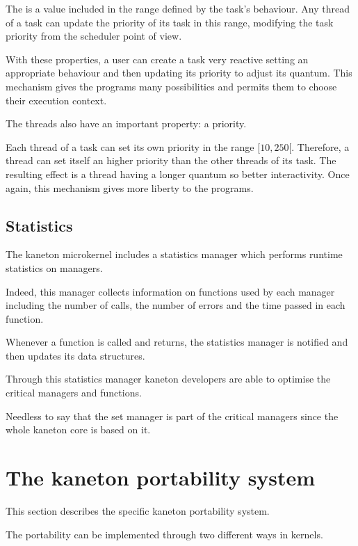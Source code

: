 \begin{multicols}{2}
The  is a value included in the range defined by the
task's behaviour. Any thread of a task can update the priority of its
task in this range, modifying the task priority from the scheduler
point of view.

With these properties, a user can create a task very reactive setting an
appropriate behaviour and then updating its priority to adjust its quantum.
This mechanism gives the programs many possibilities and permits them to
choose their execution context.

The threads also have an important property: a priority.

Each thread of a task can set its own priority in the range $[10, 250[$.
Therefore, a thread can set itself an higher priority than the other
threads of its task. The resulting effect is a thread having a longer quantum
so better interactivity. Once again, this mechanism gives more liberty to the
programs.

%
%

\subsection{Statistics}

The kaneton microkernel includes a statistics manager which performs
runtime statistics on managers.

Indeed, this manager collects information on functions used by each manager
including the number of calls, the number of errors and the time passed
in each function.

Whenever a function is called and returns, the statistics manager is notified
and then updates its data structures.

Through this statistics manager kaneton developers are able to optimise
the critical managers and functions.

Needless to say that the set manager is part of the critical managers since
the whole kaneton core is based on it.

%
%

\section{The kaneton portability system}

This section describes the specific kaneton portability system.

The portability can be implemented through two different ways in kernels.


\end{multicols}
